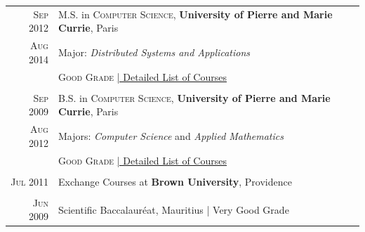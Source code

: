 \documentclass[a4paper,10pt]{article} %
\begin{document}
\begin{tabular}{rl}


\textsc{Sep 2012} & M.S. in \textsc{Computer Science}, \textbf{University of Pierre and Marie Currie}, Paris\\
\textsc{Aug 2014} & Major: \emph{Distributed Systems and Applications}\\
                  & \normalsize \textsc{Good Grade} \hyperlink{grds_ms}{\hfill | \footnotesize Detailed List of Courses}\\
&\\


\textsc{Sep 2009} & B.S. in \textsc{Computer Science}, \textbf{University of Pierre and Marie Currie}, Paris \\
\textsc{Aug 2012} & Majors: \emph{Computer Science} and \emph{Applied Mathematics}\\
				  & \normalsize \textsc{Good Grade} \hyperlink{grds_bs}{\hfill| \footnotesize Detailed List of Courses}\\
&\\


\textsc{Jul 2011} & Exchange Courses at \textbf{Brown University}, Providence\\
&\\


\textsc{Jun 2009} & Scientific Baccalaur\'eat, Mauritius | Very Good Grade %


\end{tabular}



\end{document}
